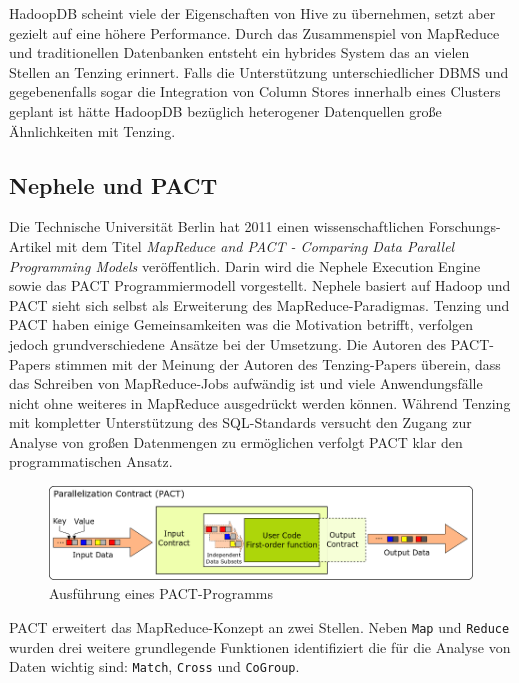 \documentclass[a4paper]{article}
\begin{document}
HadoopDB scheint viele der Eigenschaften von Hive zu übernehmen, setzt aber gezielt auf eine höhere Performance. Durch das Zusammenspiel von MapReduce und traditionellen Datenbanken entsteht ein hybrides System das an vielen Stellen an Tenzing erinnert. Falls die Unterstützung unterschiedlicher DBMS und gegebenenfalls sogar die Integration von Column Stores innerhalb eines Clusters geplant ist hätte HadoopDB bezüglich heterogener Datenquellen große Ähnlichkeiten mit Tenzing.

\newpage
\subsection{Nephele und PACT}
Die Technische Universität Berlin hat 2011 einen wissenschaftlichen Forschungs-Artikel mit dem Titel \textit{MapReduce and PACT - Comparing Data Parallel Programming Models} \cite{PACT} veröffentlich. Darin wird die Nephele Execution Engine sowie das PACT Programmiermodell vorgestellt. Nephele basiert auf Hadoop und PACT sieht sich selbst als Erweiterung des MapReduce-Paradigmas. Tenzing und PACT haben einige Gemeinsamkeiten was die Motivation betrifft, verfolgen jedoch grundverschiedene Ansätze bei der Umsetzung. Die Autoren des PACT-Papers stimmen mit der Meinung der Autoren des Tenzing-Papers überein, dass das Schreiben von MapReduce-Jobs aufwändig ist und viele Anwendungsfälle nicht ohne weiteres in MapReduce ausgedrückt werden können. Während Tenzing mit kompletter Unterstützung des SQL-Standards versucht den Zugang zur Analyse von großen Datenmengen zu ermöglichen verfolgt PACT klar den programmatischen Ansatz. 

\begin{figure}[H]
	\centering
	\includegraphics[width=\textwidth]{pact.png}
	\caption{Ausführung eines PACT-Programms}
	\label{fig:pact}
\end{figure}

PACT erweitert das MapReduce-Konzept an zwei Stellen. Neben \texttt{Map} und \texttt{Reduce} wurden drei weitere grundlegende Funktionen identifiziert die für die Analyse von Daten wichtig sind: \texttt{Match}, \texttt{Cross} und \texttt{CoGroup}. 
\end{document}
